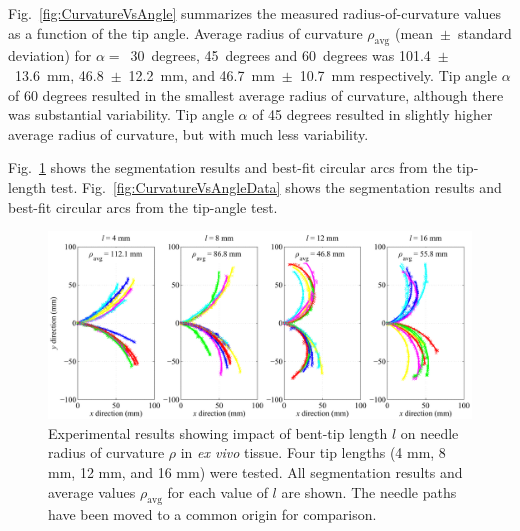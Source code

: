Fig.~\ref{fig:CurvatureVsAngle} summarizes the measured radius-of-curvature values as a function of the tip angle. Average radius of curvature $\rho_{\text{avg}}$ (mean~$\pm$~standard deviation) for $\alpha =$~30~degrees, 45~degrees and 60~degrees was 101.4~$\pm$~13.6~mm, 46.8~$\pm$~12.2~mm, and 46.7~mm~$\pm$~10.7~mm respectively. Tip angle $\alpha$ of 60 degrees resulted in the smallest average radius of curvature, although there was substantial variability. Tip angle $\alpha$ of 45 degrees resulted in slightly higher average radius of curvature, but with much less variability.

Fig.~\ref{fig:CurvatureVsLengthData} shows the segmentation results and best-fit circular arcs from the tip-length test. Fig.~\ref{fig:CurvatureVsAngleData} shows the segmentation results and best-fit circular arcs from the tip-angle test.  

\begin{figure}[!t]
\centering
\includegraphics[width=\textwidth]{Images/Chapter3/CurvatureVsLength/CurvatureVsLengthData}%
\caption[Experimental results showing impact of bent-tip length $l$]{Experimental results showing impact of bent-tip length $l$ on needle radius of curvature $\rho$ in \textit{ex vivo} tissue. Four tip lengths (4 mm, 8 mm, 12 mm, and 16 mm) were tested. All segmentation results and average values $\rho_{\text{avg}}$ for each value of $l$ are shown. The needle paths have been moved to a common origin for comparison.}
\label{fig:CurvatureVsLengthData}
\end{figure}

